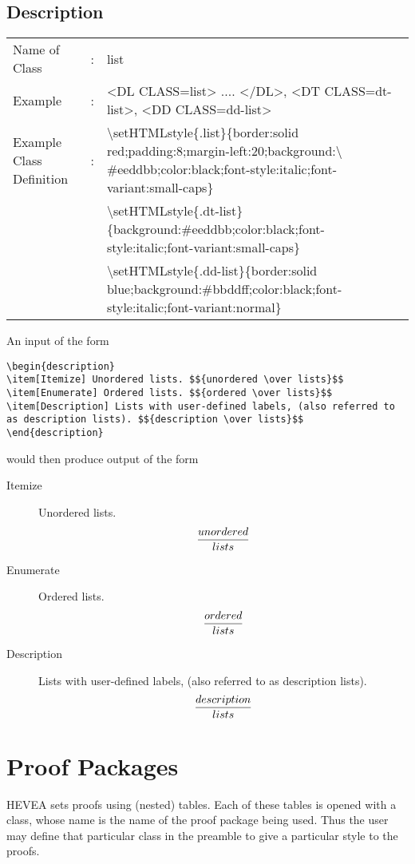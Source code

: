 \documentclass {article}
\begin{document}
\subsection{Description}
\begin{tabular}{lll}
Name of Class & : & list\\
Example & : & <DL CLASS=list> .... </DL>, <DT CLASS=dt-list>, <DD CLASS=dd-list>\\
Example Class Definition & : & $\setminus$setHTMLstyle\{.list\}\{border:solid red;padding:8;margin-left:20;background:$\setminus$\#eeddbb;color:black;font-style:italic;font-variant:small-caps\}\\
 & & $\setminus$setHTMLstyle\{.dt-list\}\{background:\#eeddbb;color:black;font-style:italic;font-variant:small-caps\}\\
 & & $\setminus$setHTMLstyle\{.dd-list\}\{border:solid blue;background:\#bbddff;color:black;font-style:italic;font-variant:normal\}\\
\end{tabular}

An input of the form
\begin{verbatim}
\begin{description}
\item[Itemize] Unordered lists. $${unordered \over lists}$$
\item[Enumerate] Ordered lists. $${ordered \over lists}$$
\item[Description] Lists with user-defined labels, (also referred to as description lists). $${description \over lists}$$ 
\end{description}
\end{verbatim}
would then produce output of the form
\begin{description}
\item[Itemize] Unordered lists. $${unordered \over lists}$$
\item[Enumerate] Ordered lists. $${ordered \over lists}$$
\item[Description] Lists with user-defined labels, (also referred to as description lists). $${description \over lists}$$ 
\end{description}

\section{Proof Packages}
HEVEA sets proofs using (nested) tables. Each of these tables is opened with a class, whose name is the name of the proof package being used. Thus the user may define that particular class in the preamble to give a particular style to the proofs. 
\end{document}
